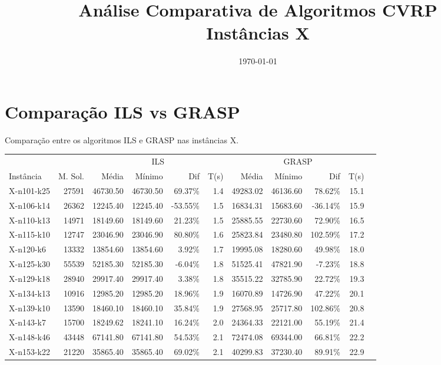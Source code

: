 \documentclass[12pt,a4paper]{article}
\title{Análise Comparativa de Algoritmos CVRP\\Instâncias X}
\author{}
\date{\today}
\begin{document}
\maketitle

\section{Comparação ILS vs GRASP}

Comparação entre os algoritmos ILS e GRASP nas instâncias X.

\begin{table}[htbp]
\centering
\small
\begin{tabular}{@{}lrrrrrrrrrr@{}}
\toprule
& & \multicolumn{4}{c}{ILS} & \multicolumn{4}{c}{GRASP}  \\
\cmidrule(lr){3-6} \cmidrule(lr){7-10}
Instância & M. Sol. & Média & Mínimo & Dif & T(s) & Média & Mínimo & Dif & T(s) \\
\midrule
    X-n101-k25 & 27591 & 46730.50 & 46730.50 & 69.37\% & 1.4 & 49283.02 & 46136.60 & 78.62\% & 15.1 \\
    X-n106-k14 & 26362 & 12245.40 & 12245.40 & -53.55\% & 1.5 & 16834.31 & 15683.60 & -36.14\% & 15.9 \\
    X-n110-k13 & 14971 & 18149.60 & 18149.60 & 21.23\% & 1.5 & 25885.55 & 22730.60 & 72.90\% & 16.5 \\
    X-n115-k10 & 12747 & 23046.90 & 23046.90 & 80.80\% & 1.6 & 25823.84 & 23480.80 & 102.59\% & 17.2 \\
    X-n120-k6 & 13332 & 13854.60 & 13854.60 & 3.92\% & 1.7 & 19995.08 & 18280.60 & 49.98\% & 18.0 \\
    X-n125-k30 & 55539 & 52185.30 & 52185.30 & -6.04\% & 1.8 & 51525.41 & 47821.90 & -7.23\% & 18.8 \\
    X-n129-k18 & 28940 & 29917.40 & 29917.40 & 3.38\% & 1.8 & 35515.22 & 32785.90 & 22.72\% & 19.3 \\
    X-n134-k13 & 10916 & 12985.20 & 12985.20 & 18.96\% & 1.9 & 16070.89 & 14726.90 & 47.22\% & 20.1 \\
    X-n139-k10 & 13590 & 18460.10 & 18460.10 & 35.84\% & 1.9 & 27568.95 & 25717.80 & 102.86\% & 20.8 \\
    X-n143-k7 & 15700 & 18249.62 & 18241.10 & 16.24\% & 2.0 & 24364.33 & 22121.00 & 55.19\% & 21.4 \\
    X-n148-k46 & 43448 & 67141.80 & 67141.80 & 54.53\% & 2.1 & 72474.08 & 69344.00 & 66.81\% & 22.2 \\
    X-n153-k22 & 21220 & 35865.40 & 35865.40 & 69.02\% & 2.1 & 40299.83 & 37230.40 & 89.91\% & 22.9 \\

\end{tabular}
\end{table}
\end{document}
